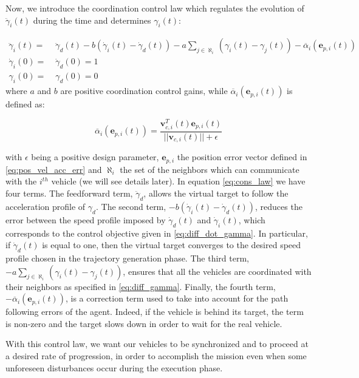 Now, we introduce the coordination control law which regulates the evolution of
$\ddot{\gamma}_i(t)$ during the time and determines $\gamma_i(t)$:

\begin{equation} \label{eq:cons_law}
  \begin{aligned}
    \ddot{\gamma}_i(t) = & \; \ddot{\gamma}_d(t) - b (\dot{\gamma}_i(t) - \dot{\gamma}_d(t)) - a \sum_{j \in \aleph_i} (\gamma_i(t) - \gamma_j(t)) - \overline{\alpha}_i (\bm{e}_{p,i}(t)) \\
    \dot{\gamma}_i(0) = & \; \dot{\gamma}_d(0) = 1 \\
    \gamma_i(0) = & \; \gamma_d(0) = 0
  \end{aligned}
\end{equation}
where $a$ and $b$ are positive coordination control gains, while $\overline{\alpha}_i (\bm{e}_{p,i}(t))$
is defined as:

\begin{equation} \label{eq:error_term}
  \overline{\alpha}_i (\bm{e}_{p,i}(t)) = \frac{\bm{v}_{c,i}^T(t) \bm{e}_{p,i}(t)}{||\bm{v}_{c,i}(t)|| + \epsilon}
\end{equation}

with $\epsilon$ being a positive design parameter, $\bm{e}_{p,i}$ the position
error vector defined in \eqref{eq:pos_vel_acc_err} and $\aleph_i$ the set of the
neighbors which can communicate with the $i^{th}$ vehicle (we will see details later).
In equation \eqref{eq:cons_law} we have four terms. The feedforward term,
$\ddot{\gamma}_d$, allows the virtual target to follow the acceleration profile of
$\gamma_d$.
The second term, $- b (\dot{\gamma}_i(t) - \dot{\gamma}_d(t))$, reduces the error
between the speed profile imposed by $\dot{\gamma}_d(t)$ and $\dot{\gamma}_i(t)$,
which corresponds to the control objective given in \eqref{eq:diff_dot_gamma}.
In particular, if $\dot{\gamma}_d(t)$ is equal to one, then the virtual target converges
to the desired speed profile chosen in the trajectory generation phase.
The third term, $- a \sum_{j \in \aleph_i} (\gamma_i(t) - \gamma_j(t))$, ensures that
all the vehicles are coordinated with their neighbors as specified in \eqref{eq:diff_gamma}.
Finally, the fourth term, $- \overline{\alpha}_i (\bm{e}_{p,i}(t))$, is a correction term
used to take into account for the path following errors of the agent. Indeed, if the
vehicle is behind its target, the term is non-zero and the target slows down in order
to wait for the real vehicle.

With this control law, we want our vehicles to be synchronized and to proceed at
a desired rate of progression, in order to accomplish the mission even when
some unforeseen disturbances occur during the execution phase.
